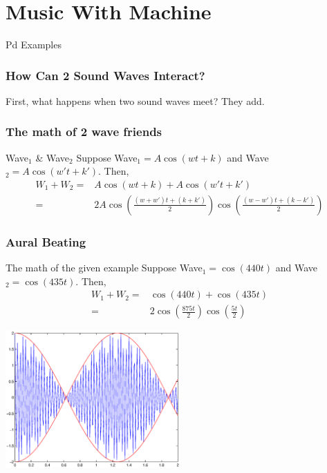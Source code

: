 \documentclass[10pt]{beamer}
\begin{document}
\section{Music With Machine}
\begin{frame}
 Pd Examples
 \end{frame}
 

\begin{frame}
\frametitle{How Can 2 Sound Waves Interact?}
\begin{block}{First, what happens when two sound waves meet?}
They add.
\end{block}

\end{frame}

\begin{frame}
\frametitle{The math of 2 wave friends}
\begin{block}{Wave$_1$ \& Wave$_2$}
Suppose Wave$_1 = A\cos(wt + k)$ and Wave$_2 = A\cos(w't + k')$. Then,
\begin{align*}
W_1 + W_2 =&A\cos(wt + k) + A\cos(w't + k')\\
=&2A\cos(\frac{(w+w')t+(k+k')}{2})\cos(\frac{(w-w')t +(k- k')}{2})
\end{align*}
\end{block}

\end{frame}

\begin{frame}
\frametitle{Aural Beating}
\begin{block}{The math of the given example}
Suppose Wave$_1 = \cos(440t)$ and Wave$_2 = \cos(435t)$. Then,
\begin{align*}
W_1 + W_2 =&\cos(440t) + \cos(435t)\\
=&2\cos(\frac{875t}{2})\cos(\frac{5t}{2})
\end{align*}
\end{block}

\begin{block}{}
\center \includegraphics[width = 0.5\textwidth]{BeatingWave.eps}
\end{block}


\end{frame}
\end{document}

